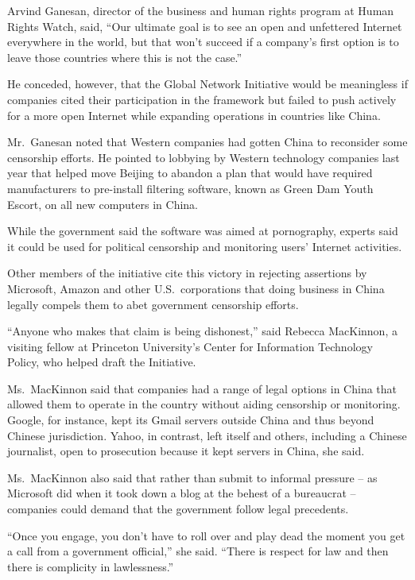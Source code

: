 ﻿\documentclass[12pt]{article}
\begin{document}
Arvind Ganesan, director of the business and human rights program at Human Rights Watch, said, ``Our
ultimate goal is to see an open and unfettered Internet everywhere in the world, but that won't
succeed if a company's first option is to leave those countries where this is not the case.''

He conceded, however, that the Global Network Initiative would be meaningless if companies cited
their participation in the framework but failed to push actively for a more open Internet while
expanding operations in countries like China.

Mr.~Ganesan noted that Western companies had gotten China to reconsider some censorship efforts. He
pointed to lobbying by Western technology companies last year that helped move Beijing to abandon a
plan that would have required manufacturers to pre-install filtering software, known as Green Dam
Youth Escort, on all new computers in China.

While the government said the software was aimed at pornography, experts said it could be used for
political censorship and monitoring users' Internet activities.

Other members of the initiative cite this victory in rejecting assertions by Microsoft, Amazon and
other U.S.~corporations that doing business in China legally compels them to abet government
censorship efforts.

``Anyone who makes that claim is being dishonest,'' said Rebecca MacKinnon, a visiting fellow at
Princeton University's Center for Information Technology Policy, who helped draft the Initiative.

Ms.~MacKinnon said that companies had a range of legal options in China that allowed them to operate
in the country without aiding censorship or monitoring. Google, for instance, kept its Gmail servers
outside China and thus beyond Chinese jurisdiction. Yahoo, in contrast, left itself and others,
including a Chinese journalist, open to prosecution because it kept servers in China, she said.

Ms.~MacKinnon also said that rather than submit to informal pressure -- as Microsoft did when it
took down a blog at the behest of a bureaucrat -- companies could demand that the government follow
legal precedents.

``Once you engage, you don't have to roll over and play dead the moment you get a call from a
government official,'' she said. ``There is respect for law and then there is complicity in
lawlessness.''
\end{document}
